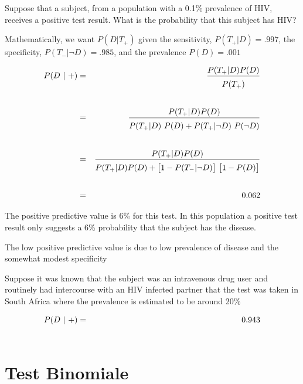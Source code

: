 \documentclass[12pt,openany]{book}
\theoremstyle{mio}
\theoremstyle{liscio}
\begin{document}
Suppose that a subject, from a population with a {\color{violet} 0.1\% prevalence}
of HIV, receives a positive test result. What is the probability
that this subject has HIV?

Mathematically, we want $P(D | T_+)$ given the sensitivity, {\color{violet}$P(T_+
| D) = .997$}, the specificity, {\color{violet}$P(T_- | \neg D) =.985$}, and the
prevalence {\color{violet}$P(D) = .001$}

\begin{eqnarray*}
P(D ~|~ +)& = &\frac{P(T_+|D)P(D)}{P(T_+)\vphantom{\Big[}}\\ \\
& = &\frac{P(T_+|D)P(D)}{P(T_+|D)\ P(D) + P(T_+|\neg D)\ P(\neg D)\vphantom{\Big[}}\\ \\
& = & \frac{P(T_+|D)P(D)}{P(T_+|D)P(D) + \big[1-P(T_-|\neg D)\big]\ \big[1 - P(D)\big]\vphantom{\Big[}} \\ \\
& = & 0.062
\end{eqnarray*}

The {\color{violet}positive predictive value is 6\%} for this test. In this population a positive test result only suggests a 6\% probability that the subject has the disease. 


The low positive predictive value is due to low prevalence of disease and the
somewhat modest specificity 

Suppose it was known that the subject was an intravenous drug user and routinely had intercourse with an HIV infected partner that the test was taken in South Africa where the prevalence is estimated to be around 20\%

\begin{eqnarray*}
P(D ~|~ +)& = & 0.943\\
& \hphantom{=} & \hphantom{\frac{P(T_+|D)P(D)}{P(T_+|D)P(D) + \big[1-P(T_-|\neg D)\big]\ \big[1 - P(D)\big]\vphantom{\Big[}}}
\end{eqnarray*}


\clearpage\section{Test Binomiale}


\def\medrel#1{\parbox[t]{6ex}{$\displaystyle\hfil #1$}}
\def\ceq#1#2#3{\parbox{15ex}{$\displaystyle #1$}\medrel{#2}$\displaystyle  #3$}
\end{document}
